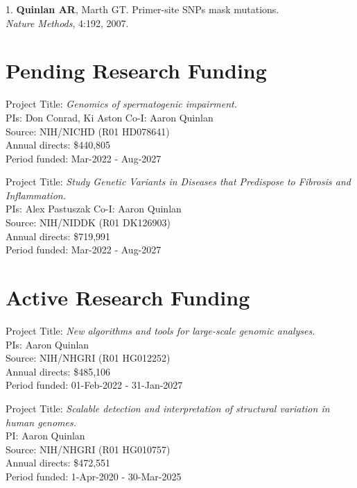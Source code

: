 \documentclass[margin,line]{cv}
\begin{document}
\begin{resume}
\begin{list}{*}{}
    \item[1.] \textbf{Quinlan AR}, Marth GT.
    Primer-site SNPs mask mutations.\\
    \textit{Nature Methods}, 4:192, 2007.

    \end{list}





    \section{\mysidestyle Pending Research Funding}
    Project Title: \textit{Genomics of spermatogenic impairment.} \\
    PIs: Don Conrad, Ki Aston
    Co-I: Aaron Quinlan \\
    Source: NIH/NICHD (R01 HD078641) \\
    Annual directs: \$440,805 \\
    Period funded: Mar-2022 - Aug-2027

    Project Title: \textit{Study Genetic Variants in Diseases that Predispose to Fibrosis and Inflammation.} \\
    PIs: Alex Pastuszak
    Co-I: Aaron Quinlan \\
    Source: NIH/NIDDK (R01 DK126903) \\
    Annual directs: \$719,991 \\
    Period funded: Mar-2022 - Aug-2027

    \section{\mysidestyle Active Research Funding}

    Project Title: \textit{New algorithms and tools for large-scale genomic analyses.} \\
    PIs: Aaron Quinlan \\
    Source: NIH/NHGRI (R01 HG012252) \\
    Annual directs: \$485,106 \\
    Period funded: 01-Feb-2022 - 31-Jan-2027

    Project Title: \textit{Scalable detection and interpretation of structural variation in human genomes.} \\
    PI: Aaron Quinlan \\
    Source: NIH/NHGRI (R01 HG010757) \\
    Annual directs: \$472,551 \\
    Period funded: 1-Apr-2020 - 30-Mar-2025


\end{resume}
\end{document}
